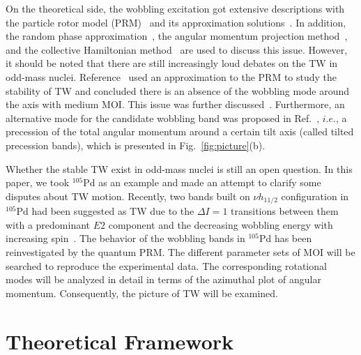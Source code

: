 \documentclass[aps,prc,preprint,showpacs,groupedaddress,floatfix,amsmath,amssymb]{revtex4-1}
\begin{document}
On the theoretical side, the wobbling excitation got extensive descriptions with the particle rotor model (PRM)~\cite{Frauendorf14,Hamamoto02,
Hamamoto2003PRC, Hagemann04, Streck18,Broocks21,CQB19} and
its approximation solutions~\cite{Tanabe08,Tanabe10,Tanabe17, Budaca2018PRC,Budaca2021, Raduta2018, Raduta2020JPG, Raduta2020PRC,Raduta2021,Lawrie20}.
In addition,
the random phase approximation~\cite{Matsuzaki02, Matsuzaki2003PRC,Matsuzaki2004PRC, Matsuzaki2004PRC_v1,Shimizu2005PRC,Shimizu2008PRC,Shoji09, Frauendorf2015PRC, Nakatsukasa16},
the angular momentum projection  method~\cite{Pr1352,Ba1302,Shimada18},
and the collective Hamiltonian method~\cite{CHENQB14, CHENQB16,WXH18} are used to discuss this issue.
However, it should be noted that there are still increasingly loud debates on the TW in odd-mass nuclei.
Reference~\cite{Tanabe17} used an approximation to the PRM to study the stability of TW and concluded there is an absence of the wobbling mode around the axis with medium MOI.
This issue was
further discussed~\cite{Budaca2018PRC,Frauendorf182,Tanabe18}.
Furthermore, an alternative mode for the candidate wobbling band was proposed in Ref.~\cite{Lawrie20}, $i.e.$, a precession of the total angular momentum around a certain tilt axis (called tilted precession bands), which is presented in Fig.~\ref{fig:picture}(b).


Whether the stable TW exist in odd-mass nuclei is still an open question. In this paper, we took $^{105}$Pd as an example and made an attempt to clarify some disputes about TW motion. Recently,
two bands built on $\nu h_{11/2}$ configuration in $^{105}$Pd had been suggested as TW due to
the $\Delta I=1$ transitions between them with a predominant $E2$ component and
the decreasing wobbling energy with increasing spin~\cite{Pd105}.
The behavior of the wobbling bands in $^{105}$Pd has been reinvestigated by the quantum PRM. The different parameter sets of MOI will be searched to reproduce the experimental data. The corresponding rotational modes will be analyzed in detail in terms of the azimuthal plot of angular momentum. Consequently, the picture of TW will be examined.




\section{Theoretical Framework}
\end{document}
